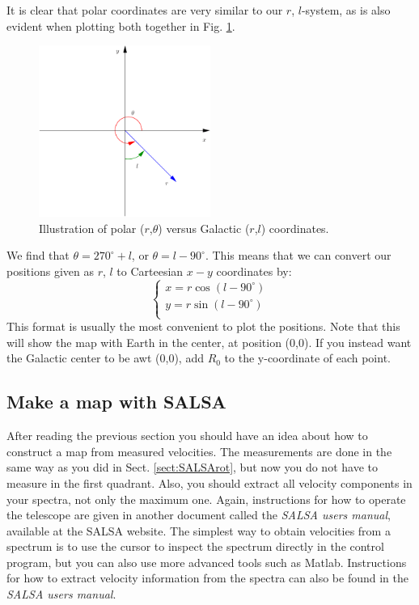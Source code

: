 It is clear that polar coordinates are very similar to our $r$, $l$-system,
as is also evident when plotting both together in Fig. \ref{fig:polar}.
\begin{figure}[ht]
\begin{center}
\includegraphics[width=0.5\textwidth]{../figures/coordinate.pdf}
\caption{Illustration of polar ($r$,$\theta$) versus Galactic
  ($r$,$l$) coordinates.}
\label{fig:polar}
\end{center}
\end{figure}
We find that $\theta=270^\circ +l$, or $\theta=l-90^\circ$. This means that we can convert our positions given as $r$,
$l$ to Carteesian $x-y$ coordinates by:
\begin{equation}
	\boxed{
\left\{ 
\begin{array}{l}
	x=r \cos (l-90^\circ) \\
	y=r \sin (l-90^\circ) \\
\end{array}
\right.}
\label{eqn:rpmtocart}
\end{equation} 
This format is usually the most convenient to plot the positions. Note that this will show the map
with Earth in the center, at position (0,0). If you instead want the Galactic center to be awt (0,0),
add $R_0$ to the y-coordinate of each point.

\subsection{Make a map with SALSA}
\label{sect:SALSAmap}
After reading the previous section you should have an idea about how to
construct a map from measured velocities. The measurements are done in the same
way as you did in Sect. \ref{sect:SALSArot}, but now you do not have to measure
in the first quadrant. Also, you should extract all velocity components in your
spectra, not only the maximum one.  Again, instructions for how to operate the
telescope are given in another document called the \emph{SALSA users manual},
available at the SALSA website.  The simplest way to obtain velocities from a
spectrum is to use the cursor to inspect the spectrum directly in the control
program, but you can also use more advanced tools such as Matlab. Instructions
for how to extract velocity information from the spectra can also be found in
the \emph{SALSA users manual}.


